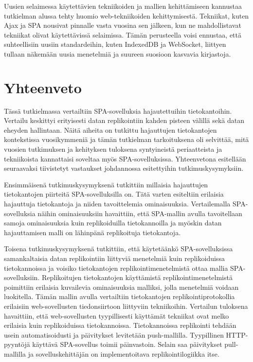\documentclass[finnish,twoside,censored,csm,sw-track-2018]{HYthesisML}
\begin{document}
Uusien selaimessa käytettävien tekniikoiden ja mallien kehittämiseen kannustaa tutkielman alussa tehty huomio web-tekniikoiden kehittymisestä. Tekniikat, kuten Ajax ja SPA nousivat pinnalle vasta vuosina sen jälkeen, kun ne mahdollistavat tekniikat olivat käytet\-tävissä selaimissa. Tämän perusteella voisi ennustaa, että suhteellisiin uusiin standardeihin, kuten IndexedDB ja WebSocket, liittyen tullaan näkemään uusia menetelmiä ja suureen suosioon kasvavia kirjastoja.

\chapter{Yhteenveto}

Tässä tutkielmassa vertailtiin SPA-sovelluksia hajautettuihin tietokantoihin. Vertailu keskittyi erityisesti datan replikointiin kahden pisteen välillä sekä datan eheyden hallintaan. Näitä aiheita on tutkittu hajauttujen tietokantojen kontekstissa vuosikymmeniä ja tämän tutkielman tarkoituksena oli selvittää, mitä vuosien tutkimuksen ja kehityksen tuloksena syntyineistä periaatteista ja tekniikoista kannattaisi soveltaa myös SPA-sovelluksissa. Yhteenvetona esitellään seuraavaksi tiivistetyt vastaukset johdannossa esitettyihin tutkimuskysymyksiin.

Ensimmäisenä tutkimuskysymyksenä tutkittiin millaisia hajauttujen tietokantojen piirteitä SPA-sovelluksilla on. Tätä varten esiteltiin erilaisia hajauttuja tietokantoja ja niiden tavoittelemia ominaisuuksia. Vertailemalla SPA-sovelluksia näihin ominaisuuksiin havaittiin, että SPA-mallin avulla tavoitellaan samoja ominaisuuksia kuin replikoiduilla tietokannoilla ja myöskin datan hajauttamisen malli on lähinpänä replikoituja tietokantoja.

Toisena tutkimuskysymyksenä tutkittiin, että käytetäänkö SPA-sovelluksissa samankaltaisia datan replikointiin liittyviä menetelmiä kuin replikoiduissa tietokannoissa ja voisiko tietokantojen replikointimenetelmistä ottaa mallia SPA-sovelluksiin. Replikoitujen tietokantojen käyttämistä replikointimenetelmistä poimittiin erilaisia kuvailevia ominaisuuksia malliksi, jolla menetelmiä voidaan luokitella. Tämän mallin avulla vertailtiin tietokantojen replikointiprotokollia erilaisiin web-sovellusten tiedonsiirtoon liittyviin tekniikoihin. Vertailun tuloksena havaittiin, että web-sovellusten tyypillisesti käyttämät tekniikat ovat melko erilaisia kuin replikoiduissa tietokannoissa. Tietokannoissa replikointi tehdään usein automatisoidusti ja päivitykset levitetään push-mallilla. Tyypillinen HTTP-pyyntöjä käyttävä SPA-sovellus toimii päinvastoin. Selain saa päivitykset pull-mallilla ja sovelluskehittäjän on implementoitava replikointilogiikka itse.
\end{document}
